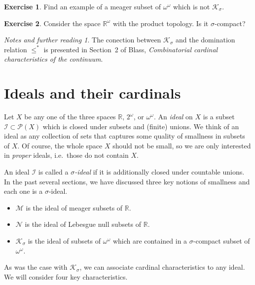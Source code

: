 \documentclass[11pt,oneside]{amsbook}
\newcommand{\RR}{\mathbb R}
\newcommand{\Null}{\mathcal N}
\newcommand{\Meager}{\mathcal M}
\newcommand{\Ksigma}{\mathcal K_\sigma}
\theoremstyle{definition}
\newtheorem{exerc}{Exercise}[section]
\theoremstyle{plain}
\theoremstyle{definition}
\theoremstyle{remark}
\newtheorem*{notes}{Notes and further reading}
\begin{document}
\begin{exerc}
  Find an example of a meager subset of $\omega^\omega$ which is not $\Ksigma$.
\end{exerc}

\begin{exerc}
  Consider the space $\RR^\omega$ with the product topology. Is it $\sigma$-compact?
\end{exerc}

\begin{notes}
  The conection between $\mathcal K_\sigma$ and the domination relation $\leq^*$ is presented in Section~2 of Blass, \emph{Combinatorial cardinal characteristics of the continuum}.
\end{notes}


\section{Ideals and their cardinals}

Let $X$ be any one of the three spaces $\RR$, $2^\omega$, or $\omega^\omega$. An \emph{ideal} on $X$ is a subset $\mathcal I\subset\mathcal P(X)$ which is closed under subsets and (finite) unions. We think of an ideal as any collection of sets that captures some quality of smallness in subsets of $X$. Of course, the whole space $X$ should not be small, so we are only interested in \emph{proper} ideals, i.e.\ those do not contain $X$.

An ideal $\mathcal I$ is called a \emph{$\sigma$-ideal} if it is additionally closed under countable unions. In the past several sections, we have discussed three key notions of smallness and each one is a $\sigma$-ideal.
\begin{itemize}
\item $\Meager$ is the ideal of meager subsets of $\RR$.
\item $\Null$ is the ideal of Lebesgue null subsets of $\RR$.
\item $\Ksigma$ is the ideal of subsets of $\omega^\omega$ which are contained in a $\sigma$-compact subset of $\omega^\omega$.
\end{itemize}

As was the case with $\Ksigma$, we can associate cardinal characteristics to any ideal. We will consider four key characteristics.
\end{document}
